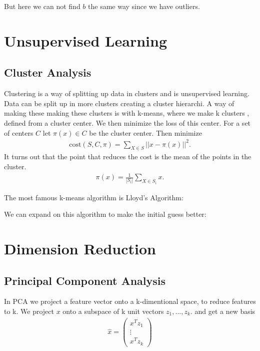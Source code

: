 \documentclass[a4paper,oneside,article]{memoir}
\begin{document}
But here we can not find $b$ the same way since we have outliers. 

\chapter{Unsupervised Learning}

\section{Cluster Analysis}
Clustering is a way of splitting up data in clusters and is unsupervised learning. Data can be split up in more clusters creating a cluster hierarchi. 
A way of making these making these clusters is with k-means, where we make k clusters , defined from a cluster center. 
We then minimize the loss of this center. For a set of centers $C$ let $π(x)\in C$ be the cluster center. 
Then minimize 
\begin{align*}
    \text{cost}(S,C,π) = \sum_{X\in S}||x-π(x)||^2.
\end{align*}
It turns out that the point that reduces the cost is the mean of the points in the cluster. 
\begin{align*}
    π(x) = \frac{1}{|S_i|}\sum_{X\in S_i}x. 
\end{align*}

The most famous k-means algorithm is Lloyd's Algorithm: 

We can expand on this algorithm to make the initial guess better: 

\chapter{Dimension Reduction}

\section{Principal Component Analysis}
In PCA we project a feature vector onto a k-dimentional space, to reduce features to k. 
We project $x$ onto a subspace of k unit vectors $z_1, ..., z_k$. and get a new basis 
\begin{align*}
    \hat{x} = \begin{pmatrix}
        x^Tz_1 \\ \vdots \\ x^Tz_k
    \end{pmatrix}
\end{align*}

\end{document}
